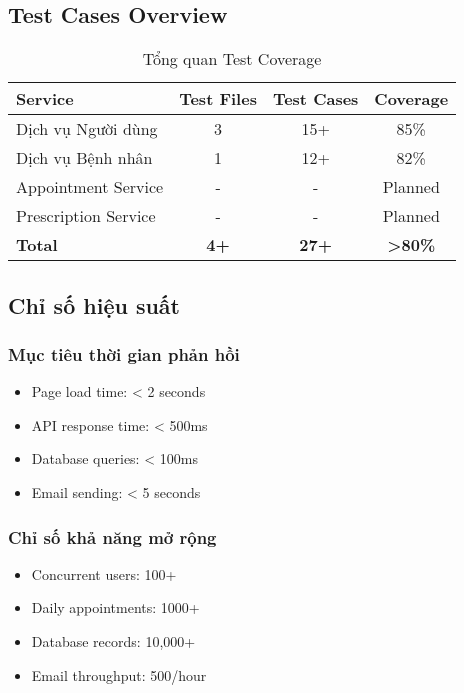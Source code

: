 \documentclass[12pt,a4paper]{report}
\begin{document}
    \subsection{Test Cases Overview}
    \begin{table}[h]
    \centering
    \begin{tabular}{|l|c|c|c|}
    \hline
    \textbf{Service} & \textbf{Test Files} & \textbf{Test Cases} & \textbf{Coverage} \\
    \hline
    Dịch vụ Người dùng & 3 & 15+ & 85\% \\
    Dịch vụ Bệnh nhân & 1 & 12+ & 82\% \\
    Appointment Service & - & - & Planned \\
    Prescription Service & - & - & Planned \\
    \hline
    \textbf{Total} & \textbf{4+} & \textbf{27+} & \textbf{>80\%} \\
    \hline
    \end{tabular}
    \caption{Tổng quan Test Coverage}
    \end{table}

    \subsection{Chỉ số hiệu suất}

    \subsubsection{Mục tiêu thời gian phản hồi}
    \begin{itemize}
        \item Page load time: < 2 seconds
        \item API response time: < 500ms
        \item Database queries: < 100ms
        \item Email sending: < 5 seconds
    \end{itemize}

    \subsubsection{Chỉ số khả năng mở rộng}
    \begin{itemize}
        \item Concurrent users: 100+
        \item Daily appointments: 1000+
        \item Database records: 10,000+
        \item Email throughput: 500/hour
    \end{itemize}
\end{document}
